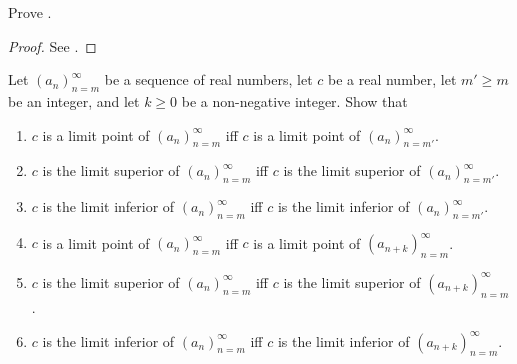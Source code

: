\exercisesection

\begin{ex}\label{i:ex:6.4.1}
  Prove .
\end{ex}

\begin{proof}
  See .
\end{proof}

\begin{ex}\label{i:ex:6.4.2}
  Let \((a_n)_{n = m}^\infty\) be a sequence of real numbers, let \(c\) be a real number, let \(m' \geq m\) be an integer, and let \(k \geq 0\) be a non-negative integer.
  Show that
  \begin{enumerate}
    \item\label{i:ex:6.4.2.a} \(c\) is a limit point of \((a_n)_{n = m}^\infty\) iff \(c\) is a limit point of \((a_n)_{n = m'}^\infty\).
    \item\label{i:ex:6.4.2.b} \(c\) is the limit superior of \((a_n)_{n = m}^\infty\) iff \(c\) is the limit superior of \((a_n)_{n = m'}^\infty\).
    \item\label{i:ex:6.4.2.c} \(c\) is the limit inferior of \((a_n)_{n = m}^\infty\) iff \(c\) is the limit inferior of \((a_n)_{n = m'}^\infty\).
    \item\label{i:ex:6.4.2.d} \(c\) is a limit point of \((a_n)_{n = m}^\infty\) iff \(c\) is a limit point of \((a_{n + k})_{n = m}^\infty\).
    \item\label{i:ex:6.4.2.e} \(c\) is the limit superior of \((a_n)_{n = m}^\infty\) iff \(c\) is the limit superior of \((a_{n + k})_{n = m}^\infty\).
    \item\label{i:ex:6.4.2.f} \(c\) is the limit inferior of \((a_n)_{n = m}^\infty\) iff \(c\) is the limit inferior of \((a_{n + k})_{n = m}^\infty\).
  \end{enumerate}
\end{ex}

